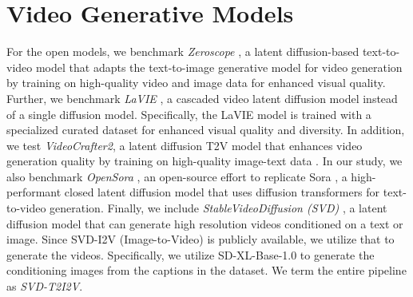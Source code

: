 










\section{Video Generative Models}
\label{app:models}


For the open models, we benchmark \textit{Zeroscope} \cite{zeroscope,wang2023modelscope}, a latent diffusion-based text-to-video model that adapts the text-to-image generative model \cite{rombach2022high} for video generation by training on high-quality video and image data for enhanced visual quality. Further, we benchmark \textit{LaVIE} \cite{wang2023lavie}, a cascaded video latent diffusion model instead of a single diffusion model. Specifically, the LaVIE model is trained with a specialized curated dataset for enhanced visual quality and diversity. In addition, we test \textit{VideoCrafter2}, a latent diffusion T2V model that enhances video generation quality by training on high-quality image-text data \cite{sun2024journeydb}. In our study, we also benchmark \textit{OpenSora} \cite{OpenSora}, an open-source effort to replicate Sora \cite{videoworldsimulators2024}, a high-performant closed latent diffusion model that uses diffusion transformers \cite{peebles2023scalable} for text-to-video generation. Finally, we include \textit{StableVideoDiffusion (SVD)} \cite{blattmann2023stable}, a latent diffusion model that can generate high resolution videos conditioned on a text or image. Since SVD-I2V (Image-to-Video) is publicly available, we utilize that to generate the videos. Specifically, we utilize SD-XL-Base-1.0 \cite{podell2023sdxl} to generate the conditioning images from the captions in the \name{} dataset. We term the entire pipeline as \textit{SVD-T2I2V}.

